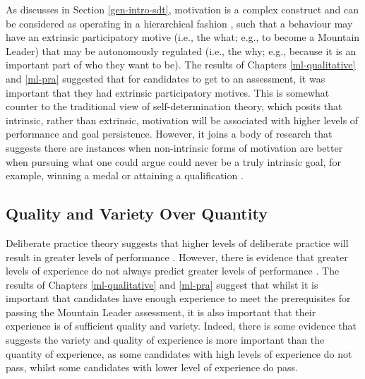 \documentclass[
  12pt,
  a4paper,
]{book}
\begin{document}
As discusses in Section \ref{gen-intro-sdt}, motivation is a complex construct and can be considered as operating in a hierarchical fashion \citep{Ingledew2009, Vallerand1997, Vallerand2002}, such that a behaviour may have an extrinsic participatory motive (i.e., the what; e.g., to become a Mountain Leader) that may be autonomously regulated (i.e., the why; e.g., because it is an important part of who they want to be). The results of Chapters \ref{ml-qualitative} and \ref{ml-pra} suggested that for candidates to get to an assessment, it was important that they had extrinsic participatory motives. This is somewhat counter to the traditional view of self-determination theory, which posits that intrinsic, rather than extrinsic, motivation will be associated with higher levels of performance and goal persistence. However, it joins a body of research that suggests there are instances when non-intrinsic forms of motivation are better when pursuing what one could argue could never be a truly intrinsic goal, for example, winning a medal or attaining a qualification \citetext{\citealp[e.g.,][\citet{Fortier1995}]{Chantal1996}; \citealp{Gullich2019}; \citealp{Hardy2017}}.

\hypertarget{quality-and-variety-over-quantity}{%
\subsection{Quality and Variety Over Quantity}\label{quality-and-variety-over-quantity}}

Deliberate practice theory suggests that higher levels of deliberate practice will result in greater levels of performance \citep{Ericsson1993}. However, there is evidence that greater levels of experience do not always predict greater levels of performance \citep[see][ Section 4.1 for a review]{Rees2016}. The results of Chapters \ref{ml-qualitative} and \ref{ml-pra} suggest that whilst it is important that candidates have enough experience to meet the prerequisites for passing the Mountain Leader assessment, it is also important that their experience is of sufficient quality and variety. Indeed, there is some evidence that suggests the variety and quality of experience is more important than the quantity of experience, as some candidates with high levels of experience do not pass, whilst some candidates with lower level of experience do pass.
\end{document}
